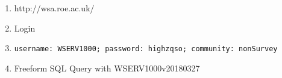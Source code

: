 \documentclass[usenatbib]{mnras}
\begin{document}
\begin{enumerate}
\item http://wsa.roe.ac.uk/ 
\item Login
\item {\tt username:	WSERV1000;  password: 	highzqso;   community: 	nonSurvey} 
\item Freeform SQL Query with  WSERV1000v20180327
\end{enumerate}











%


\end{document}

